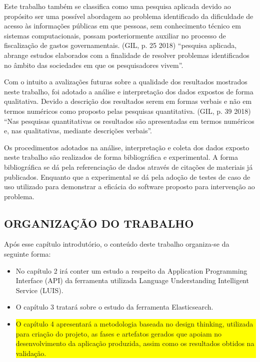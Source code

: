 Este trabalho também se classifica como uma pesquisa aplicada devido ao propósito ser uma possível abordagem ao problema identificado da dificuldade de acesso às informações públicas em que pessoas, sem conhecimento técnico em sistemas computacionais, possam posteriormente auxiliar no processo de fiscalização de gastos governamentais. (GIL, p. 25 2018) “pesquisa aplicada, abrange estudos elaborados com a finalidade de resolver problemas identificados no âmbito das sociedades em que os pesquisadores vivem”.

Com o intuito a avalizações futuras sobre a qualidade dos resultados  mostrados neste trabalho, foi adotado a análise e interpretação dos dados expostos de forma qualitativa. Devido a descrição dos resultados serem em formas verbais e não em termos numéricos como proposto pelas pesquisas quantitativa. (GIL, p. 39 2018) “Nas pesquisas quantitativas os resultados são apresentadas em termos numéricos e, nas qualitativas, mediante descrições verbais”.

Os procedimentos adotados na análise, interpretação e coleta dos dados exposto neste trabalho são realizados de forma bibliográfica e experimental. A forma bibliográfica se dá pela referenciação de dados através de citações de materiais já publicados. Enquanto que a experimental se dá pela adoção de testes de caso de uso utilizado para demonstrar a eficácia do software proposto para intervenção ao problema.

\subsection{ORGANIZAÇÃO DO TRABALHO}
Após esse capítulo introdutório, o conteúdo deste trabalho organiza-se da seguinte forma:

\begin{itemize}
	\item{No capítulo 2 irá conter um estudo a respeito da Application Programming Interface (API) da ferramenta utilizada Language Understanding Intelligent Service (LUIS).}
	\item{O capítulo 3 tratará sobre o estudo da ferramenta Elasticsearch.}
	\item{\colorbox{yellow}{\parbox{\textwidth}{O capítulo 4 apresentará a metodologia baseada no design thinking, utilizada para criação do projeto, as fases e artefatos gerados que apoiam no desenvolvimento da aplicação produzida, assim como os resultados obtidos na validação.}}}
\end{itemize}
